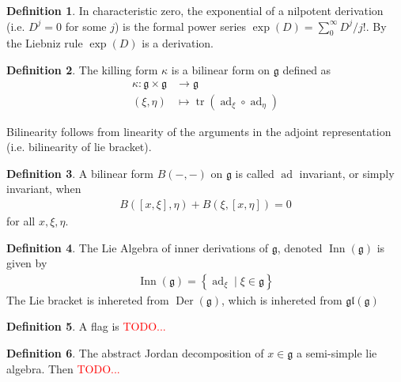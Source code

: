 \documentclass[10.5pt]{article}
\theoremstyle{definition}
\newtheorem{definition}{Definition}
\numberwithin{example}{subsection}
\numberwithin{proposition}{subsection}
\numberwithin{pb}{subsection}
\newcommand{\set}[1]{\left\{#1\right\}}
\begin{document}
    \begin{definition}\label{expofder}
        In characteristic zero, the exponential of a nilpotent derivation (i.e. \(D^j = 0\) for some \(j\)) is the formal power series \(\exp(D) = \sum_0^\infty D^j/j!\). By the Liebniz rule \(\exp(D)\) is a derivation.
    \end{definition}

    \begin{definition}\label{defkilling} The killing form \(\kappa\) is a bilinear form on \(\mathfrak{g}\) defined as
            \begin{align}
                \kappa: \mathfrak{g} \times \mathfrak{g} &\to \mathfrak{g} \\
                (\xi,\eta) &\mapsto \operatorname{tr}(\operatorname{ad}_\xi\circ\operatorname{ad}_\eta)
            \end{align}
        \end{definition}
        Bilinearity follows from linearity of the arguments in the adjoint representation (i.e. bilinearity of lie bracket).

        \begin{definition}\label{defadinvariant}
            A bilinear form \(B(-,-)\) on \(\mathfrak{g}\) is called \(\operatorname{ad}\) invariant, or simply invariant, when
            \begin{align}
                B([x,\xi],\eta) + B(\xi,[x,\eta]) = 0
            \end{align}
            for all \(x,\xi,\eta\).
        \end{definition}

        \begin{definition}\label{definng}
            The Lie Algebra of inner derivations of \(\mathfrak{g}\), denoted \(\operatorname{Inn}(\mathfrak{g})\) is given by
            \begin{align}
                \operatorname{Inn}(\mathfrak{g}) = \set{\operatorname{ad}_\xi \mid \xi \in \mathfrak{g}}
            \end{align}
            The Lie bracket is inhereted from \(\operatorname{Der}(\mathfrak{g})\), which is inhereted from \(\mathfrak{gl}(\mathfrak{g})\)
        \end{definition}

        \begin{definition}
            A flag is \textcolor{red}{TODO...}
        \end{definition}

        \begin{definition}
            The abstract Jordan decomposition of \(x \in \mathfrak{g}\) a semi-simple lie algebra. Then \textcolor{red}{TODO...}
        \end{definition}
\end{document}

